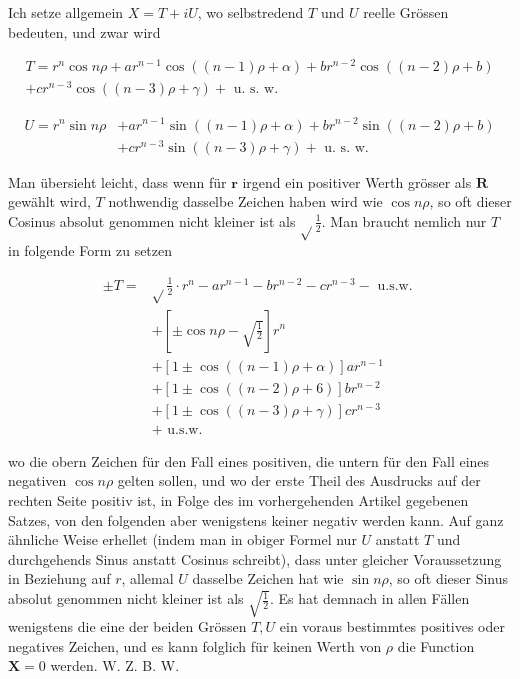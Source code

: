 \documentclass[10pt]{article}
\begin{document}
Ich setze allgemein \(X=T+i U\), wo selbstredend \(T\) und \(U\) reelle Grössen bedeuten, und zwar wird

\[
\begin{gathered}
T=r^{n} \cos n \rho+a r^{n-1} \cos ((n-1) \rho+\alpha)+b r^{n-2} \cos ((n-2) \rho+b) \\
+c r^{n-3} \cos ((n-3) \rho+\gamma)+\text { u. s. w. }
\end{gathered}
\]

\[
\begin{aligned}
U=r^{n} \sin n \rho & +a r^{n-1} \sin ((n-1) \rho+\alpha)+b r^{n-2} \sin ((n-2) \rho+b) \\
& +c r^{n-3} \sin ((n-3) \rho+\gamma)+\text { u. s. w. }
\end{aligned}
\]

Man übersieht leicht, dass wenn für \(\boldsymbol{r}\) irgend ein positiver Werth grösser als \(\boldsymbol{R}\) gewählt wird, \(T\) nothwendig dasselbe Zeichen haben wird wie \(\cos n \rho\), so oft dieser Cosinus absolut genommen nicht kleiner ist als \(\sqrt{ } \frac{1}{2}\). Man braucht nemlich nur \(T\) in folgende Form zu setzen

\[
\begin{aligned}
\pm T= & \sqrt{ } \frac{1}{2} \cdot r^{n}-a r^{n-1}-b r^{n-2}-c r^{n-3}-\text { u.s.w. } \\
& +\left[ \pm \cos n \rho-\sqrt{\frac{1}{2}}\right] r^{n} \\
& +[1 \pm \cos ((n-1) \rho+\alpha)] a r^{n-1} \\
& +[1 \pm \cos ((n-2) \rho+6)] b r^{n-2} \\
& +[1 \pm \cos ((n-3) \rho+\gamma)] c r^{n-3} \\
& + \text { u.s.w. }
\end{aligned}
\]

wo die obern Zeichen für den Fall eines positiven, die untern für den Fall eines negativen \(\cos n \rho\) gelten sollen, und wo der erste Theil des Ausdrucks auf der rechten Seite positiv ist, in Folge des im vorhergehenden Artikel gegebenen Satzes, von den folgenden aber wenigstens keiner negativ werden kann. Auf ganz ähnliche Weise erhellet (indem man in obiger Formel nur \(U\) anstatt \(T\) und durchgehends Sinus anstatt Cosinus schreibt), dass unter gleicher Voraussetzung in Beziehung auf \(r\), allemal \(U\) dasselbe Zeichen hat wie \(\sin n \rho\), so oft dieser Sinus absolut genommen nicht kleiner ist als \(\sqrt{\frac{1}{2}}\). Es hat demnach in allen Fällen wenigstens die eine der beiden Grössen \(T, U\) ein voraus bestimmtes positives oder negatives Zeichen, und es kann folglich für keinen Werth von \(\rho\) die Function \(\boldsymbol{X}=0\) werden. W. Z. B. W.
\end{document}
